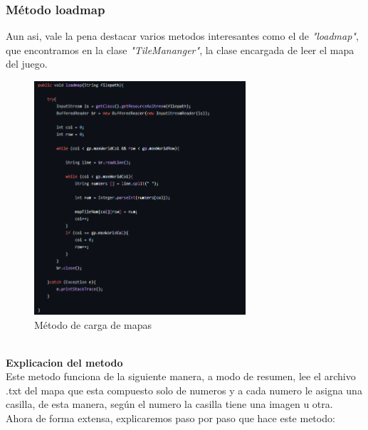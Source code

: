 \documentclass[a4paper]{article}
\begin{document}
\subsubsection{Método loadmap}
Aun asi, vale la pena destacar varios metodos interesantes como el de \textit{"loadmap"}, que encontramos en la clase \textit{"TileMananger"}, la clase encargada de leer el mapa del juego.
\begin{figure}[ht]
    \centering
    \includegraphics[width=0.7\textwidth]{Images/loadmap.PNG}
    \caption{Método de carga de mapas}
    \label{fig:metodos}
\end{figure}
\\
\textbf{Explicacion del metodo}\\
Este metodo funciona de la siguiente manera, a modo de resumen, lee el archivo .txt del mapa que esta compuesto solo de numeros y a cada numero le asigna una casilla, de esta manera, según el numero la casilla
tiene una imagen u otra.\\
Ahora de forma extensa, explicaremos paso por paso que hace este metodo:
\end{document}
